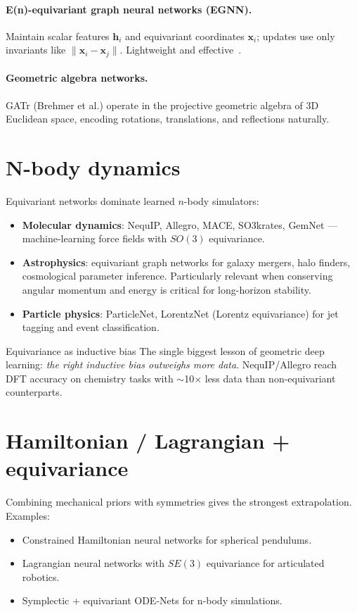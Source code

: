 \paragraph{E(n)-equivariant graph neural networks (EGNN).}
Maintain scalar features $\bm{h}_i$ and equivariant coordinates
$\bm{x}_i$; updates use only invariants like $\|\bm{x}_i-\bm{x}_j\|$.
Lightweight and effective~\cite{satorras2021egnn}.

\paragraph{Geometric algebra networks.}
GATr (Brehmer et al.) operate in the projective geometric algebra of
3D Euclidean space, encoding rotations, translations, and reflections
naturally.

\section{N-body dynamics}
Equivariant networks dominate learned $n$-body simulators:
\begin{itemize}
\item \textbf{Molecular dynamics}: NequIP, Allegro, MACE, SO3krates,
GemNet --- machine-learning force fields with $SO(3)$ equivariance.
\item \textbf{Astrophysics}: equivariant graph networks for galaxy
mergers, halo finders, cosmological parameter inference. Particularly
relevant when conserving angular momentum and energy is critical for
long-horizon stability.
\item \textbf{Particle physics}: ParticleNet, LorentzNet (Lorentz
equivariance) for jet tagging and event classification.
\end{itemize}

\begin{insight}{Equivariance as inductive bias}
The single biggest lesson of geometric deep learning: \emph{the right
inductive bias outweighs more data}. NequIP/Allegro reach DFT accuracy
on chemistry tasks with $\sim$10$\times$ less data than non-equivariant
counterparts.
\end{insight}

\section{Hamiltonian / Lagrangian + equivariance}
Combining mechanical priors with symmetries gives the strongest
extrapolation. Examples:
\begin{itemize}
\item Constrained Hamiltonian neural networks for spherical pendulums.
\item Lagrangian neural networks with $SE(3)$ equivariance for
articulated robotics.
\item Symplectic + equivariant ODE-Nets for n-body simulations.
\end{itemize}

